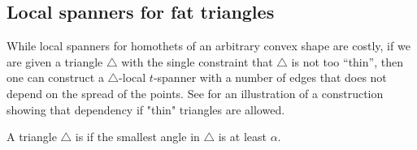 
\subsection{Local spanners for fat triangles}


While local spanners for homothets of an arbitrary convex shape are
costly, if we are given a triangle $\triangle$ with the single
constraint that $\triangle$ is not too ``thin'', then one can
construct a $\triangle$-local $t$-spanner with a number of edges that
does not depend on the spread of the points. See 
for an illustration of a construction showing that dependency if
"thin" triangles are allowed.



\begin{defn}
    A triangle $\triangle$ is  if the smallest
    angle in $\triangle$ is at least $\alpha$.
\end{defn}


